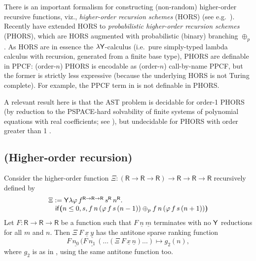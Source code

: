 There is an important formalism for constructing (non-random) higher-order recursive functions, viz., \emph{higher-order recursion schemes} (HORS) (see e.g.~\cite{DBLP:conf/lics/Ong06,DBLP:conf/lics/Ong15}).
Recently \cite{DBLP:conf/lics/KobayashiLG19} have extended HORS to \emph{probabilistic higher-order recursion schemes} (PHORS), which are HORS augmented with probabilistic (binary) branching $\oplus_p$.
As HORS are in essence the $\lambda \mathsf{Y}$-calculus \citep{DBLP:conf/lics/Statman02} (i.e.~pure simply-typed lambda calculus with recursion, generated from a finite base type), PHORS are definable in PPCF:
(order-$n$) PHORS is encodable as (order-$n$) call-by-name PPCF, but the former is strictly less expressive (because the underlying HORS is not Turing complete). 
For example, the PPCF term in  is not definable in PHORS.

A relevant result here is that the AST problem is decidable for order-1 PHORS (by reduction to the PSPACE-hard solvability of finite systems of polynomial equations with real coefficients; see \cite{DBLP:journals/jacm/EtessamiY09}), but undecidable for PHORS with order greater than 1 \citep{DBLP:conf/lics/KobayashiLG19}.

\subsection*{ (Higher-order recursion)}
Consider the higher-order function
$\Xi : (\textsf{R} \to \textsf{R} \to \textsf{R}) \to \textsf{R} \to \textsf{R} \to \textsf{R}$
recursively defined by
\[
\begin{array}{l}
\Xi := \mathsf{Y} \lambda \varphi \, f^{\textsf{R} \to \textsf{R} \to \textsf{R}} \, s^\textsf{R} \, n^\textsf{R} . \\
\quad\mathsf{if}\boldsymbol{(}n \leq 0, s, 
f \, n \, (\varphi \, f \, s \, (n - 1))
\oplus_p
f \, n \, (\varphi \, f \, s \, (n + 1))
\boldsymbol{)}
\end{array}
\]
Let $F : \textsf{R} \to \textsf{R} \to \textsf{R}$ be a function such that $F\ \underline n\ \underline m$ terminates with no $\mathsf{Y}$ reductions for all $m$ and $n$. Then $\Xi\ F\ \underline x\ \underline y$ has the antitone sparse ranking function 
\[
F \, \underline{n_0} \, (F \, \underline{n_1} \, (\dots(\Xi\ F\, \underline x\, \underline n)\dots) \mapsto g_2(n),
\] 
where $g_2$ is as in , using the same antitone function too.

